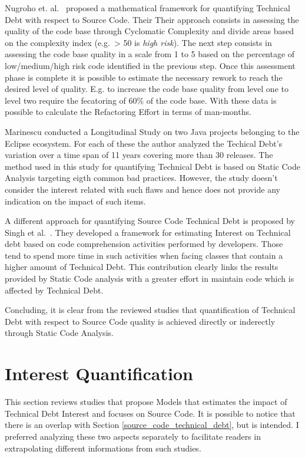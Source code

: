 Nugroho et. al.\ \cite{technicalDebtInterest} proposed a mathematical framework for quantifying Technical Debt with respect to Source Code. Their Their approach consists in assessing the quality of the code base through Cyclomatic Complexity \cite{cyclomatic_complexity} and divide areas based on the complexity index (e.g.\ > 50 is \textit{high risk}). The next step consists in assessing the code base quality in a scale from 1 to 5 based on the percentage of low/medium/high risk code identified in the previous step. Once this assessment phase is complete it is possible to estimate the necessary rework to reach the desired level of quality. E.g. to increase the code base quality from level one to level two require the fecatoring of 60\% of the code base. With these data is possible to calculate the Refactoring Effort in terms of man-months.

Marinescu \cite{assessing_technical_debt_eclipse} conducted a Longitudinal Study on two Java projects belonging to the Eclipse ecosystem. For each of these the author analyzed the Techical Debt's variation over a time span of 11 years covering more than 30 releases. The method used in this study for quantifying Technical Debt is based on Static Code Analysis targeting eigth common bad practices. However, the study doesn't consider the interest related with such flaws and hence does not provide any indication on the impact of such items.

A different approach for quantifying Source Code Technical Debt is proposed by Singh et al.\ \cite{code_td_comprehension_activities}. They developed a framework for estimating Interest on Technical debt based on code comprehension activities performed by developers. Those tend to spend more time in such activities when facing classes that contain a higher amount of Technical Debt. This contribution clearly links the results provided by Static Code analysis with a greater effort in maintain code which is affected by Technical Debt.

Concluding, it is clear from the reviewed studies that quantification of Technical Debt with respect to Source Code quality is achieved directly or inderectly through Static Code Analysis.


\section{Interest Quantification}

This section reviews studies that propose Models that estimates the impact of Technical Debt Interest and focuses on Source Code. It is possible to notice that there is an overlap with Section \ref{source_code_technical_debt}, but is intended. I preferred analyzing these two aspects separately to facilitate readers in extrapolating different informations from such studies.

